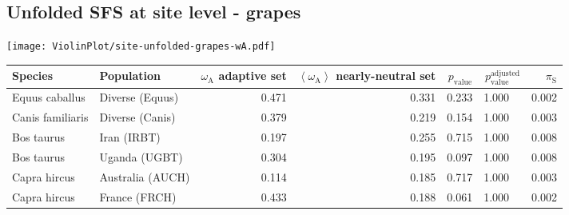 \subsection{Unfolded SFS at site level - grapes} 
\begin{center}
\texttt{[image: ViolinPlot/site-unfolded-grapes-wA.pdf]} 
\begin{adjustbox}{width = 1\textwidth}
\begin{tabular}{|l|l|r|r|r|r|r|}
\toprule
             Species &                      Population & \specialcell{$\omega_{\mathrm{A}}$ \\ adaptive set} & \specialcell{$\left< \omega_{\mathrm{A}} \right>$ \\ nearly-neutral set} & $p_{\mathrm{value}}$ & $p_{\mathrm{value}}^{\mathrm{adjusted}}$ & $\pi_{\textrm{S}}$ \\
\midrule
      Equus caballus &                 Diverse (Equus) &                                              0.471 &                                              0.331 &                0.233 &                                  1.000~~ &              0.002 \\
    Canis familiaris &                 Diverse (Canis) &                                              0.379 &                                              0.219 &                0.154 &                                  1.000~~ &              0.003 \\
          Bos taurus &                     Iran (IRBT) &                                              0.197 &                                              0.255 &                0.715 &                                  1.000~~ &              0.008 \\
          Bos taurus &                   Uganda (UGBT) &                                              0.304 &                                              0.195 &                0.097 &                                  1.000~~ &              0.008 \\
        Capra hircus &                Australia (AUCH) &                                              0.114 &                                              0.185 &                0.717 &                                  1.000~~ &              0.003 \\
        Capra hircus &                   France (FRCH) &                                              0.433 &                                              0.188 &                0.061 &                                  1.000~~ &              0.002 \\

\end{tabular}
\end{adjustbox}
\end{center}
